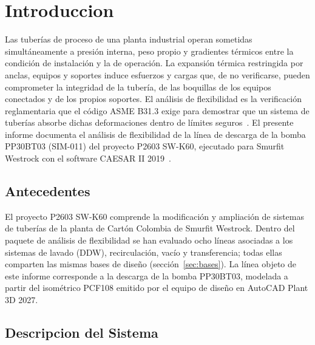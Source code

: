 \section{Introduccion}
\label{sec:intro}

Las tuber\'{i}as de proceso de una planta industrial operan sometidas
simult\'{a}neamente a presi\'{o}n interna, peso propio y gradientes t\'{e}rmicos
entre la condici\'{o}n de instalaci\'{o}n y la de operaci\'{o}n. La expansi\'{o}n
t\'{e}rmica restringida por anclas, equipos y soportes induce esfuerzos y cargas
que, de no verificarse, pueden comprometer la integridad de la tuber\'{i}a, de las
boquillas de los equipos conectados y de los propios soportes. El an\'{a}lisis de
flexibilidad es la verificaci\'{o}n reglamentaria que el c\'{o}digo ASME B31.3
exige para demostrar que un sistema de tuber\'{i}as absorbe dichas deformaciones
dentro de l\'{i}mites seguros~\cite{asme_b313_2016}. El presente informe documenta
el an\'{a}lisis de flexibilidad de la l\'{i}nea de descarga de la bomba PP30BT03
(SIM-011) del proyecto P2603 SW-K60, ejecutado para Smurfit Westrock con el
software CAESAR II 2019~\cite{caesar2_ug_2019}.

\subsection{Antecedentes}

El proyecto P2603 SW-K60 comprende la modificaci\'{o}n y ampliaci\'{o}n de
sistemas de tuber\'{i}as de la planta de Cart\'{o}n Colombia de Smurfit Westrock.
Dentro del paquete de an\'{a}lisis de flexibilidad se han evaluado ocho
l\'{i}neas asociadas a los sistemas de lavado (DDW), recirculaci\'{o}n, vac\'{i}o
y transferencia; todas ellas comparten las mismas bases de dise\~{n}o
(secci\'{o}n~\ref{sec:bases}). La l\'{i}nea objeto de este informe corresponde a
la descarga de la bomba PP30BT03, modelada a partir del isom\'{e}trico PCF108
emitido por el equipo de dise\~{n}o en AutoCAD Plant 3D 2027.

\subsection{Descripcion del Sistema}

